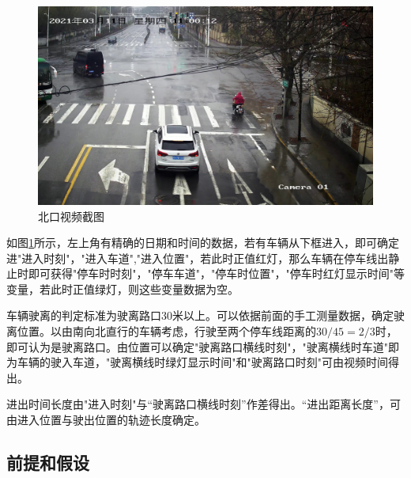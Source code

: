 \begin{figure}[h]
    \centering
    \includegraphics[scale=0.1]{figures/视频截图.jpg}
    \caption{北口视频截图}
    \label{fig:p4}
\end{figure}

如图\ref{fig:p4}所示，左上角有精确的日期和时间的数据，若有车辆从下框进入，即可确定进"进入时刻"，"进入车道","进入位置"，若此时正值红灯，那么车辆在停车线出静止时即可获得"停车时时刻"，"停车车道"，"停车时位置"，"停车时红灯显示时间"等变量，若此时正值绿灯，则这些变量数据为空。

车辆驶离的判定标准为驶离路口30米以上。可以依据前面的手工测量数据，确定驶离位置。以由南向北直行的车辆考虑，行驶至两个停车线距离的$30/45=2/3$时，即可认为是驶离路口。由位置可以确定"驶离路口横线时刻"，"驶离横线时车道"即为车辆的驶入车道，"驶离横线时绿灯显示时间"和"驶离路口时刻"可由视频时间得出。

进出时间长度由"进入时刻"与“驶离路口横线时刻”作差得出。“进出距离长度”，可由进入位置与驶出位置的轨迹长度确定。

\subsection{前提和假设}\label{subsec:hypothesis-premise}

